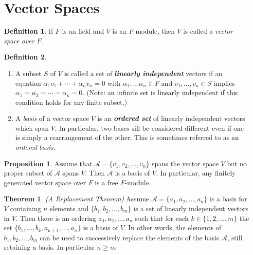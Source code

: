 \documentclass[10pt]{article}
\theoremstyle{definition}
\newtheorem{thm}{Theorem}[section]
\newtheorem*{prop}{Proposition}
\newtheorem*{defn}{Definition}
\newcommand{\nl}{\vspace{7em}}
\renewcommand{\hl}{}
\newcommand{\al}{\alpha}
\newcommand{\A}{\mathcal{A}}
\begin{document}
\section*{Vector Spaces}
\setcounter{thm}{0}

\begin{defn}
If $F$ is an field and $V$ is an $F$-module, then $V$ is called a \textit{vector space over $F$}.
\end{defn}

\nl

\begin{defn}\nl
\begin{enumerate}
\item A subset $S$ of $V$ is called a set of \textbf{\textit{linearly independent}} vectors if an equation $\al_1v_1+\cdots +\al_nv_n = 0$ with $\al_1,\ldots \al_n\in F$ and $v_1,\ldots, v_n\in S$ implies $\al_1 = \al_2 = \cdots = \al_n = 0$. \hl{(Note: an infinite set is linearly independent if this condition holds for any finite subset.)}
\item A \textit{basis} of a vector space $V$ is an \textbf{\textit{ordered set}} of linearly independent vectors which span $V$. In particular, two bases sill be considered different even if one is simply a rearrangement of the other. This is sometimes referred to as an \textit{ordered basis}.
\end{enumerate}
\end{defn}

\nl

\begin{prop}
Assume that $\A = \{v_1,v_2,\ldots, v_n\}$ spans the vector space $V$ but no proper subset of $\A$ spans $V$. Then $\A$ is a basis of $V$. \hl{In particular, any finitely generated vector space over $F$ is a free $F$-module.}
\end{prop}

\nl

\begin{thm}\hl{\textit{(A Replacement Theorem)}}
Assume $\A = \{a_1,a_2,\ldots,a_n\}$ is a basis for $V$ containing $n$ elements and $\{b_1,b_2,\ldots, b_m\}$ is a set of linearly independent vectors in $V$. Then there is an ordering $a_1,a_2,\ldots,a_n$ such that for each $k\in \{1,2,\ldots,m\}$ the set $\{b_1,\ldots, b_k, a_{k+1}, \ldots, a_n\}$ is a basis of $V$. In other words, the elements of $b_1,b_2,\ldots, b_m$ can be used to successively replace the elements of the basis $\A$, still retaining a basis. In particular $n\geq m$
\end{thm}
\end{document}

